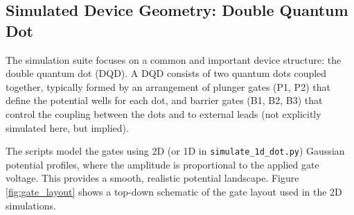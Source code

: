 \documentclass{article}
\begin{document}
\subsection{Simulated Device Geometry: Double Quantum Dot}
The simulation suite focuses on a common and important device structure: the double quantum dot (DQD). A DQD consists of two quantum dots coupled together, typically formed by an arrangement of plunger gates (P1, P2) that define the potential wells for each dot, and barrier gates (B1, B2, B3) that control the coupling between the dots and to external leads (not explicitly simulated here, but implied).

The scripts model the gates using 2D (or 1D in \texttt{simulate\_1d\_dot.py}) Gaussian potential profiles, where the amplitude is proportional to the applied gate voltage. This provides a smooth, realistic potential landscape. Figure \ref{fig:gate_layout} shows a top-down schematic of the gate layout used in the 2D simulations.
\end{document}

